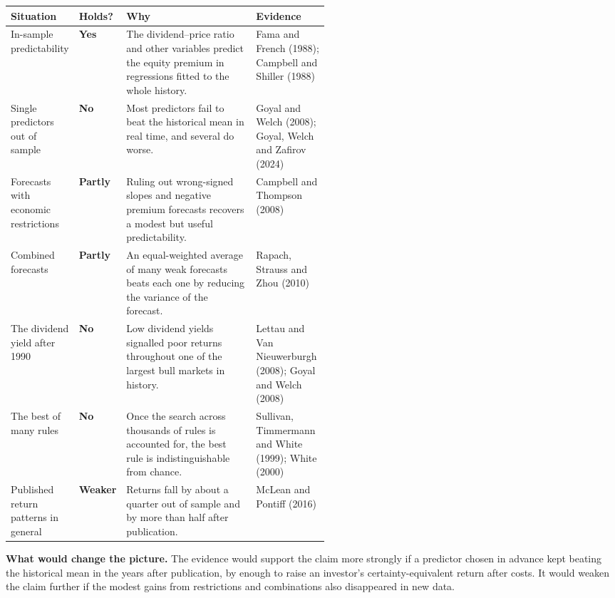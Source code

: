 \begin{center}
\small
\begin{tabularx}{\linewidth}{@{}>{\raggedright\arraybackslash}p{0.19\linewidth}>{\raggedright\arraybackslash}p{0.10\linewidth}>{\raggedright\arraybackslash}X>{\raggedright\arraybackslash}p{0.23\linewidth}@{}}
\toprule
Situation & Holds? & Why & Evidence \\
\midrule
In-sample predictability & \textbf{Yes} & The dividend--price ratio and other variables predict the equity premium in regressions fitted to the whole history. & Fama and French (1988); Campbell and Shiller (1988) \\
\addlinespace[3pt]
Single predictors out of sample & \textbf{No} & Most predictors fail to beat the historical mean in real time, and several do worse. & Goyal and Welch (2008); Goyal, Welch and Zafirov (2024) \\
\addlinespace[3pt]
Forecasts with economic restrictions & \textbf{Partly} & Ruling out wrong-signed slopes and negative premium forecasts recovers a modest but useful predictability. & Campbell and Thompson (2008) \\
\addlinespace[3pt]
Combined forecasts & \textbf{Partly} & An equal-weighted average of many weak forecasts beats each one by reducing the variance of the forecast. & Rapach, Strauss and Zhou (2010) \\
\addlinespace[3pt]
The dividend yield after 1990 & \textbf{No} & Low dividend yields signalled poor returns throughout one of the largest bull markets in history. & Lettau and Van Nieuwerburgh (2008); Goyal and Welch (2008) \\
\addlinespace[3pt]
The best of many rules & \textbf{No} & Once the search across thousands of rules is accounted for, the best rule is indistinguishable from chance. & Sullivan, Timmermann and White (1999); White (2000) \\
\addlinespace[3pt]
Published return patterns in general & \textbf{Weaker} & Returns fall by about a quarter out of sample and by more than half after publication. & McLean and Pontiff (2016) \\
\bottomrule
\end{tabularx}
\end{center}

\textbf{What would change the picture.} The evidence would support the claim more strongly if a predictor chosen in advance kept beating the historical mean in the years after publication, by enough to raise an investor's certainty-equivalent return after costs. It would weaken the claim further if the modest gains from restrictions and combinations also disappeared in new data.

